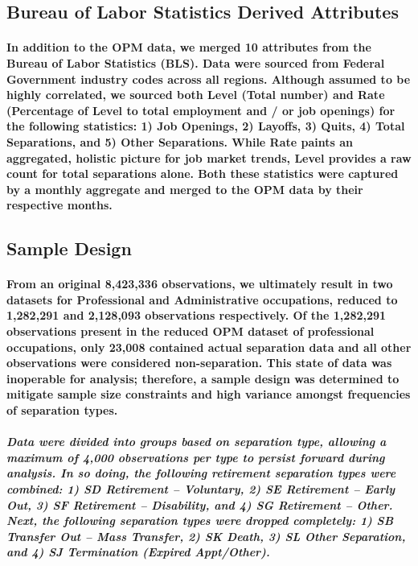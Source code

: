 \documentclass{article}
\begin{document}
\subsection{Bureau of Labor Statistics Derived Attributes}

\paragraph{In addition to the OPM data, we merged 10 attributes from the Bureau of Labor Statistics (BLS). Data were sourced from Federal Government industry codes across all regions. Although assumed to be highly correlated, we sourced both Level (Total number) and Rate (Percentage of Level to total employment and / or job openings) for the following statistics: 1) Job Openings, 2) Layoffs, 3) Quits, 4) Total Separations, and 5) Other Separations. While Rate paints an aggregated, holistic picture for job market trends, Level provides a raw count for total separations alone. Both these statistics were captured by a monthly aggregate and merged to the OPM data by their respective months.}
 
\subsection{Sample Design}

\paragraph{From an original 8,423,336 observations, we ultimately result in two datasets for Professional and Administrative occupations, reduced to 1,282,291 and 2,128,093 observations respectively. Of the 1,282,291 observations present in the reduced OPM dataset of professional occupations, only 23,008 contained actual separation data and all other observations were considered non-separation. This state of data was inoperable for analysis; therefore, a sample design was determined to mitigate sample size constraints and high variance amongst frequencies of separation types.}
 
\subparagraph{Data were divided into groups based on separation type, allowing a maximum of 4,000 observations per type to persist forward during analysis. In so doing, the following retirement separation types were combined: 1) SD Retirement – Voluntary, 2) SE Retirement – Early Out, 3) SF Retirement – Disability, and 4) SG Retirement – Other. Next, the following separation types were dropped completely: 1) SB Transfer Out – Mass Transfer, 2) SK Death, 3) SL Other Separation, and 4) SJ Termination (Expired Appt/Other).}
 
\end{document}
